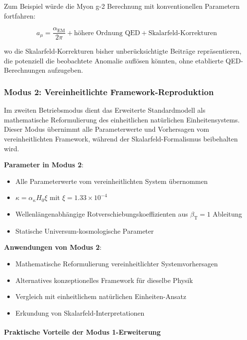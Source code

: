 \documentclass[12pt,a4paper]{article}
\newcommand{\alphaEM}{\alpha_{\text{EM}}}
\newcommand{\betaT}{\beta_{\text{T}}}
\newcommand{\xipar}{\xi}
\begin{document}
	Zum Beispiel würde die Myon g-2 Berechnung mit konventionellen Parametern fortfahren:
	
	\begin{equation}
		a_\mu = \frac{\alphaEM}{2\pi} + \text{höhere Ordnung QED} + \text{Skalarfeld-Korrekturen}
	\end{equation}
	
	wo die Skalarfeld-Korrekturen bisher unberücksichtigte Beiträge repräsentieren, die potenziell die beobachtete Anomalie auflösen könnten, ohne etablierte QED-Berechnungen aufzugeben.
	
	\subsubsection{Modus 2: Vereinheitlichte Framework-Reproduktion}
	\label{subsubsec:mode2_unified_reproduction}
	
	Im zweiten Betriebsmodus dient das Erweiterte Standardmodell als mathematische Reformulierung des einheitlichen natürlichen Einheitensystems. Dieser Modus übernimmt alle Parameterwerte und Vorhersagen vom vereinheitlichten Framework, während der Skalarfeld-Formalismus beibehalten wird.
	
	\textbf{Parameter in Modus 2}:
	\begin{itemize}
		\item Alle Parameterwerte vom vereinheitlichten System übernommen
		\item $\kappa = \alpha_\kappa H_0 \xipar$ mit $\xipar = 1.33 \times 10^{-4}$
		\item Wellenlängenabhängige Rotverschiebungskoeffizienten aus $\betaT = 1$ Ableitung
		\item Statische Universum-kosmologische Parameter
	\end{itemize}
	
	\textbf{Anwendungen von Modus 2}:
	\begin{itemize}
		\item Mathematische Reformulierung vereinheitlichter Systemvorhersagen
		\item Alternatives konzeptionelles Framework für dieselbe Physik
		\item Vergleich mit einheitlichem natürlichen Einheiten-Ansatz
		\item Erkundung von Skalarfeld-Interpretationen
	\end{itemize}
	
	\paragraph{Praktische Vorteile der Modus 1-Erweiterung}
	\label{par:practical_advantages_mode1}
	
\end{document}
